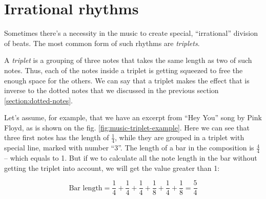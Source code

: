 \documentclass[../sparc.tex]{subfiles}
\begin{document}
\section{Irrational rhythms}

Sometimes there's a necessity in the music to create special, ``irrational''
division of beats.  The most common form of such rhythms are \emph{triplets}.

A \emph{triplet} is a grouping of three notes that takes the same length as two
of such notes.  Thus, each of the notes inside a triplet is getting squeezed to
free the enough space for the others.  We can say that a triplet makes the
effect that is inverse to the dotted notes that we discussed in the previous
section \ref{section:dotted-notes}.


Let's assume, for example, that we have an excerpt from ``Hey You'' song by Pink
Floyd, as is shown on the fig. \ref{fig:music-triplet-example}.  Here we can see
that three first notes has the length of $\frac{1}{4}$, while they are grouped
in a triplet with special line, marked with number ``3''.  The length of a bar
in the composition is $\frac{4}{4}$ -- which equals to 1.  But if we to calculate
all the note length in the bar without getting the triplet into account, we will
get the value greater than 1:

\begin{equation}
  \mbox{Bar length} = \frac{1}{4} + \frac{1}{4}
  + \frac{1}{4} + \frac{1}{8} + \frac{1}{4} + \frac{1}{8} = \frac{5}{4}
\end{equation}
\end{document}
